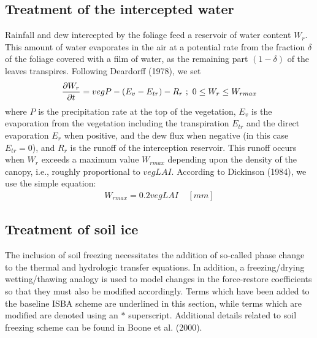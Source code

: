 \subsection{Treatment of the intercepted water}

Rainfall and dew intercepted by the foliage feed a
reservoir of water content $W_r$.  This amount of water
evaporates in the air at a potential rate from the fraction
$\delta$ of the foliage covered with a film of water, as the
remaining part $(1-\delta)$ of the leaves transpires.
Following Deardorff (1978), we set
\begin{eqnarray}
{\partial W_r \over \partial t} = veg P - (E_v-E_{tr}) - R_r \ ; \
0 \leq W_r \leq W_{rmax}
\end{eqnarray}
where $P$ is the precipitation rate at the top of the vegetation,
$E_v$ is the evaporation from the vegetation including the
transpiration $E_{tr}$ and the direct evaporation $E_r$ when
positive, and the dew flux when negative (in this case $E_{tr} = 0$),
and $R_r$ is the runoff of the interception reservoir.
This runoff occurs when $W_r$ exceeds a maximum value $W_{rmax}$
depending upon the density of the canopy, i.e., roughly proportional
to $veg LAI$.
According to Dickinson (1984), we use the simple equation:
\begin{eqnarray}
W_{rmax} = 0.2 veg LAI \ \ \ \ \ [mm]
\end{eqnarray}

\subsection{Treatment of soil ice}

The inclusion of soil freezing necessitates the addition
of so-called phase change to the thermal and hydrologic
transfer equations. In addition,
a freezing/drying wetting/thawing analogy is
used to model changes in the force-restore coefficients
so that they must also be modified accordingly. Terms which have been
added to the baseline ISBA scheme are underlined in this
section, while terms which are modified are denoted using
an $\ast$ superscript.
Additional details related to soil freezing
scheme can be found in Boone et al. (2000).


